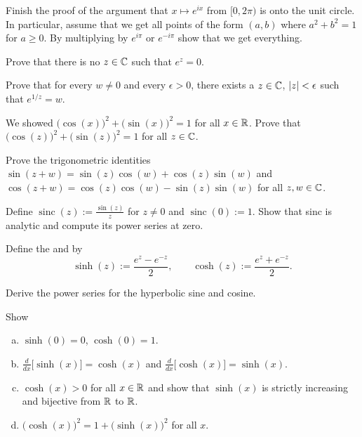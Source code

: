 \begin{exercise}
Finish the proof of the argument that $x \mapsto e^{ix}$ from
$[0,2\pi)$ is onto the unit circle.  In particular, assume that
we get all points of the form $(a,b)$ where $a^2+b^2=1$ for $a \geq 0$.
By multiplying by $e^{i\pi}$ or $e^{-i\pi}$ show that we get everything.
\end{exercise}

\begin{exercise}
Prove that there is no $z \in {\mathbb{C}}$ such that $e^z = 0$.
\end{exercise}

\begin{exercise}
Prove that for every $w \not= 0$ and every $\epsilon > 0$,
there exists a $z \in {\mathbb{C}}$, $\lvert {z} \rvert < \epsilon$ such that $e^{1/z} = w$.
\end{exercise}

\begin{exercise}
We showed
${\bigl( \cos(x) \bigr)}^2 + {\bigl( \sin(x) \bigr)}^2 = 1$
for all $x \in {\mathbb{R}}$.
Prove that
${\bigl( \cos(z) \bigr)}^2 + {\bigl( \sin(z) \bigr)}^2 = 1$
for all $z \in {\mathbb{C}}$.
\end{exercise}

\begin{exercise}
Prove the trigonometric identities
$\sin(z + w) = \sin(z) \cos(w) + \cos(z) \sin(w)$ and
$\cos(z + w) = \cos(z) \cos(w) - \sin(z) \sin(w)$ for all $z,w \in {\mathbb{C}}$.
\end{exercise}

\begin{exercise}
Define $\operatorname{sinc}(z) := \frac{\sin(z)}{z}$ for $z \not=0$ and
$\operatorname{sinc}(0) := 1$.
Show that sinc is analytic and compute its power series at zero.
\end{exercise}

\pagebreak[2]
\begin{exnote}
Define the \emph{} and
\emph{} by
\begin{equation*}
\sinh(z) := \frac{e^z-e^{-z}}{2}, \qquad
\cosh(z) := \frac{e^z+e^{-z}}{2}.
\end{equation*}
\end{exnote}

\begin{exercise}
Derive the power series for the hyperbolic sine and cosine.
\end{exercise}

\begin{exercise}
Show
\begin{enumerate}[a)]
\item
$\sinh(0) = 0$, $\cosh(0) = 1$.
\item
$\frac{d}{dx} \bigl[ \sinh(x) \bigr] = \cosh(x)$ and
$\frac{d}{dx} \bigl[ \cosh(x) \bigr] = \sinh(x)$.
\item
$\cosh(x) > 0$ for all $x \in {\mathbb{R}}$ and show that
$\sinh(x)$ is strictly increasing and bijective
from ${\mathbb{R}}$ to ${\mathbb{R}}$.
\item
${\bigl(\cosh(x)\bigr)}^2 = 1 + {\bigl(\sinh(x)\bigr)}^2$ for all
$x$.
\end{enumerate}
\end{exercise}

